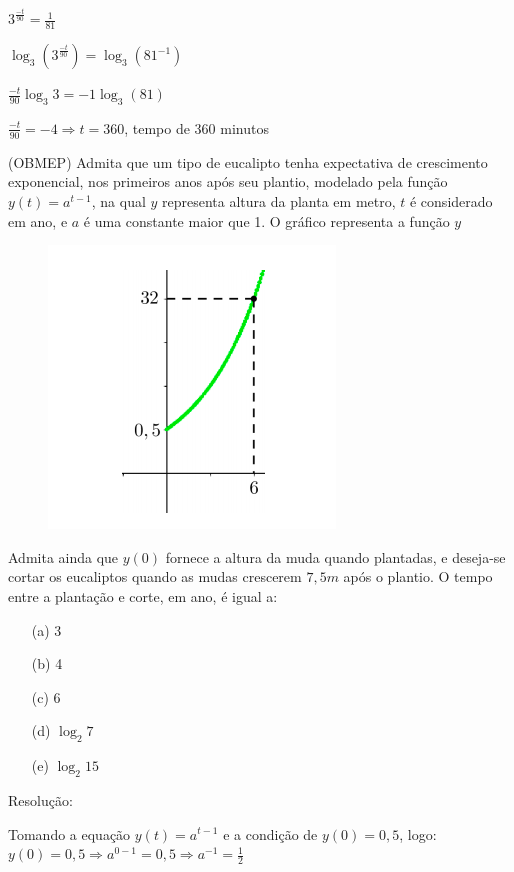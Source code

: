 \begin{multicols*}{2}
\begin{itemize}
            $3^{\frac{-t}{90}} = \frac{1}{81}$

            $ \log_3 \left( 3^{\frac{-t}{90}} \right) = \log_3 \left(81^{-1} \right)$

            $\frac{-t}{90} \log_3 3 = -1 \log_3 (81)$

            $\frac{-t}{90} = -4 \Rightarrow t = 360$, tempo de 360 minutos
    \end{itemize}

    \execnum (OBMEP) Admita que um tipo de eucalipto tenha expectativa de crescimento exponencial, nos 				primeiros anos após seu plantio, modelado pela função $y(t) = a^{t-1}$, na qual $y$ representa  		altura da planta em metro, $t$ é considerado em ano, e $a$  é uma constante maior que 1. O 				gráfico representa a função $y$

    \begin{figure}[H]
        \centering
        \includegraphics[scale=0.4]{assets/rafael/img23.png}
    \end{figure}
    Admita ainda que $y(0)$ fornece a altura da muda quando plantadas, e deseja-se cortar os 				eucaliptos quando as mudas crescerem $7,5m$ após o plantio. O tempo entre a plantação e corte, 			em ano, é igual a:
    \begin{itemize}
        \item[(a)] 3
        \item[(b)] 4
        \item[(c)] 6
        \item[(d)] $\log_2 7$
        \item[(e)] $\log_2 15$
    \end{itemize}
    Resolução:

    Tomando a equação $y(t) = a^{t-1}$ e a condição de $y(0) = 0,5$, logo:
    $y(0) = 0,5 \Rightarrow a^{0-1} = 0,5 \Rightarrow a^{-1} = \frac{1}{2}$


\end{multicols*}
